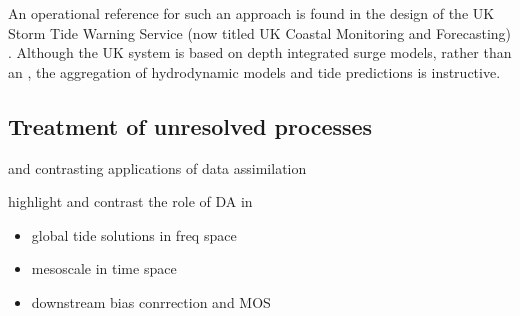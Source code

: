 An operational reference for such an approach is found in the design of the UK Storm Tide Warning Service (now titled UK Coastal Monitoring and Forecasting) \cite{Horsburg:2009ui}.   Although the UK system is based on depth integrated surge models, rather than an \OGCM{}, the aggregation of hydrodynamic models and tide predictions is instructive. 






 


\subsection{Treatment of unresolved processes}

and contrasting applications of data assimilation

highlight and contrast the role of DA in 
\begin{itemize}
    \item global tide solutions in freq space
    \item mesoscale in time space
    \item downstream bias conrrection and MOS
\end{itemize}

